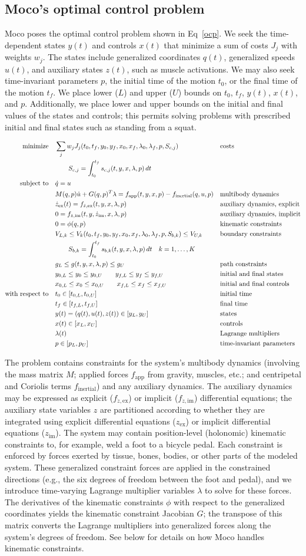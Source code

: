 \documentclass[10pt,letterpaper]{article}
\newcommand{\ocp}{
\begin{adjustwidth}{-1.125in}{-1.125in} %
\begin{align}
    \begin{aligned}
        \mbox{minimize}
         \quad & \sum_j w_{j} J_{j}(t_0, t_f, y_0, y_f, x_{0}, \mathrlap{x_{f}, \lambda_0, \lambda_f, p, S_{c,j})} && \textrm{costs} \\
        & \quad\quad S_{c,j} = \int_{t_0}^{t_f} s_{c,j}(t, y, x, \lambda, p)\,dt  \\
        \mbox{subject to}
         \quad & \dot{q} = u \\
         & M(q, p)\dot{u} + G(q, p)^T \lambda = f_{\mathrm{app}}(t, y, x, p) - f_{\mathrm{inertial}}(q, u, p)  && \textrm{multibody dynamics} \\
         & \dot{z}_\textrm{ex}(t) = f_{\dot{z},\textrm{ex}}(t, y, x, \lambda, p) && \textrm{auxiliary dynamics, explicit} \\
         & 0 = f_{\dot{z},\textrm{im}}(t, y, \dot{z}_{\textrm{im}}, x, \lambda, p) &&  \textrm{auxiliary dynamics, implicit}\\
         & 0 = \phi(q, p) && \textrm{kinematic constraints} \\
         & V_{L,k} \leq V_k(t_0, t_f, y_0, y_f, x_{0}, x_{f}, \lambda_0, \lambda_f, p, S_{b,k}) \leq V_{U,k} && \textrm{boundary constraints} \\
         & \quad\quad S_{b,k} = \int_{t_0}^{t_f} s_{b,k}(t, y, x, \lambda, p)\,dt \quad k = 1, \ldots, K\\
         & g_{L} \leq g(t, y, x, \lambda, p) \leq g_{U} && \textrm{path constraints} \\
         & y_{0,L} \leq y_0 \leq y_{0,U} \quad\quad y_{f,L} \leq y_f \leq y_{f,U} && \textrm{initial and final states} \\
         & x_{0,L} \leq x_0 \leq x_{0,U} \quad\quad x_{f,L} \leq x_f \leq x_{f,U} && \textrm{initial and final controls} \\
         \mbox{with respect to} \quad
         & t_0 \in [t_{0,L}, t_{0,U}] && \textrm{initial time} \\
         & t_f \in [t_{f,L}, t_{f,U}] && \textrm{final time} \\  
         & y(t) = (q(t), u(t), z(t)) \in [y_{L}, y_{U}] && \textrm{states} \\
         & x(t) \in [x_{L}, x_{U}] && \textrm{controls} \\
         & \lambda(t) && \textrm{Lagrange multipliers} \\
         & p \in [p_{L}, p_{U}] && \textrm{time-invariant parameters}
    \end{aligned}
    \label{ocp}
\end{align}
\end{adjustwidth}
}
\begin{document}
\linenumbers


\subsection*{Moco's optimal control problem}

Moco poses the optimal control problem shown in Eq~\ref{ocp}. We seek the time-dependent states $y(t)$ and controls $x(t)$ that minimize a sum of costs $J_j$ with weights $w_j$. The states include generalized coordinates $q(t)$, generalized speeds $u(t)$, and auxiliary states $z(t)$, such as muscle activations. We may also seek time-invariant parameters $p$, the initial time of the motion $t_0$, or the final time of the motion $t_f$. We place lower ($L$) and upper ($U$) bounds on $t_0$, $t_f$, $y(t)$, $x(t)$, and $p$. Additionally, we place lower and upper bounds on the initial and final values of the states and controls; this permits solving problems with prescribed initial and final states such as standing from a squat.

\ocp

The problem contains constraints for the system's multibody dynamics (involving the mass matrix $M$; applied forces $f_\mathrm{app}$ from gravity, muscles, etc.; and centripetal and Coriolis terms $f_\mathrm{inertial}$) and any auxiliary dynamics. The auxiliary dynamics may be expressed as explicit ($f_{\dot{z},\mathrm{ex}}$) or implicit ($f_{\dot{z},\mathrm{im}}$) differential equations; the auxiliary state variables $z$ are partitioned according to whether they are integrated using explicit differential equations ($z_{\mathrm{ex}}$) or implicit differential equations ($z_{\mathrm{im}}$). The system may contain position-level (holonomic) kinematic constraints to, for example, weld a foot to a bicycle pedal. Each constraint is enforced by forces exerted by tissue, bones, bodies, or other parts of the modeled system. These generalized constraint forces are applied in the constrained directions (e.g., the six degrees of freedom between the foot and pedal), and we introduce time-varying Lagrange multiplier variables $\lambda$ to solve for these forces. The derivatives of the kinematic constraints $\phi$ with respect to the generalized coordinates yields the kinematic constraint Jacobian $G$; the transpose of this matrix converts the Lagrange multipliers into generalized forces along the system's degrees of freedom. See below for details on how Moco handles kinematic constraints.
\end{document}
